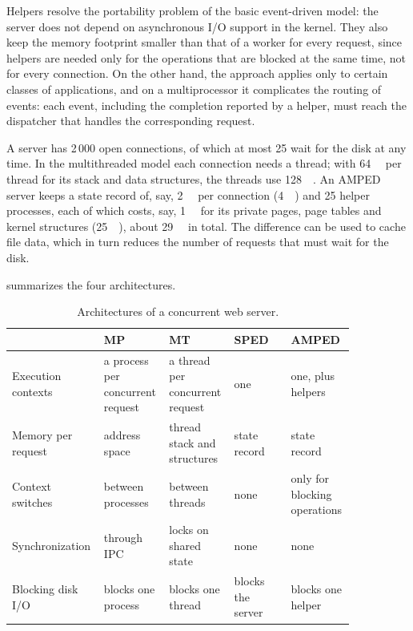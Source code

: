 \documentclass[../main.tex]{subfiles}
\begin{document}
Helpers resolve the portability problem of the basic event-driven model:
the server does not depend on asynchronous I/O support in the kernel.  They
also keep the memory footprint smaller than that of a worker for every
request, since helpers are needed only for the operations that are blocked
at the same time, not for every connection.  On the other hand, the
approach applies only to certain classes of applications, and on a
multiprocessor it complicates the routing of events: each event, including
the completion reported by a helper, must reach the dispatcher that handles
the corresponding request.

\begin{example}
  A server has 2\,000 open connections, of which at most 25 wait for the
  disk at any time.  In the multithreaded model each connection needs a
  thread; with \SI{64}{\kilo\byte} per thread for its stack and data
  structures, the threads use \SI{128}{\mega\byte}.  An AMPED server
  keeps a state record of, say, \SI{2}{\kilo\byte} per connection
  (\SI{4}{\mega\byte}) and 25 helper processes, each of which costs, say,
  \SI{1}{\mega\byte} for its private pages, page tables and kernel
  structures (\SI{25}{\mega\byte}), about \SI{29}{\mega\byte} in total.  The
  difference can be used to cache file data, which in turn reduces the
  number of requests that must wait for the disk.
\end{example}

 summarizes the four architectures.

\begin{table}[htbp]
  \centering
  \caption{Architectures of a concurrent web server.}
  \label{tab:l06-models}
  \small
  \begin{tabular}{@{}>{\raggedright\arraybackslash}p{0.19\linewidth}>{\raggedright\arraybackslash}p{0.165\linewidth}>{\raggedright\arraybackslash}p{0.165\linewidth}>{\raggedright\arraybackslash}p{0.165\linewidth}>{\raggedright\arraybackslash}p{0.165\linewidth}@{}}
    \toprule
    & MP & MT & SPED & AMPED \\
    \midrule
    Execution contexts & a process per concurrent request & a thread per
      concurrent request & one & one, plus helpers \\
    Memory per request & address space & thread stack and structures &
      state record & state record \\
    Context switches & between processes & between threads & none & only
      for blocking operations \\
    Synchronization & through IPC & locks on shared state & none & none \\
    Blocking disk I/O & blocks one process & blocks one thread & blocks the
      server & blocks one helper \\
    \bottomrule
  \end{tabular}
\end{table}
\end{document}
